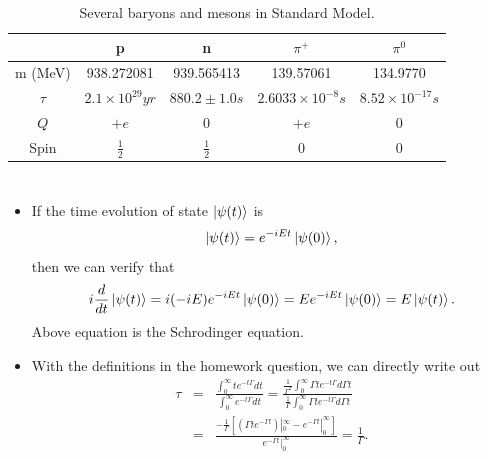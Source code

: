\documentclass[11pt]{article}
\begin{document}
\begin{table}[htb]
  \centering
  \caption{Several baryons and mesons in Standard Model. }
  \label{tb:bm}
  \begin{tabular}{|c|c|c|c|c|}
  \hline
            & p             & n              & $\pi^+$                  & $\pi^0$                \\ \hline
  m (MeV)   & 938.272081    & 939.565413     & 139.57061                & 134.9770               \\ \hline
  $\tau$ &$2.1 \times 10^{29} yr$        & $880.2 \pm1.0 s$ & $2.6033 \times 10 ^{-8} s$ & $8.52 \times 10^{-17} s$ \\ \hline
  $Q$       & $+e$          & 0              & $+e$                     & 0                      \\ \hline
  Spin      & $\frac{1}{2}$ & $\frac{1}{2}$  & 0                        & 0                      \\ \hline
  \end{tabular}
\end{table}
  
\section { }
\begin{itemize}
  \item If the time evolution of state $\ket{\psi(t)}$ is
  \begin{eqnarray}
    \ket{\psi(t)}=e^{-iEt}\ket{\psi(0)},
  \end{eqnarray} 
  then we can verify that
  \begin{eqnarray}
    i \frac{d}{dt} \ket{\psi(t)}=i(-i E) e^{-iEt}\ket{\psi(0)}  = E e^{-iEt}\ket{\psi(0)} = E \ket{\psi(t)}.
  \end{eqnarray}
  Above equation is the Schrodinger equation.
  \item With the definitions in the homework question, we can directly write out 
  \begin{eqnarray}
    \tau&=&\frac{\int_0^\infty t e^{-t\Gamma} dt}{\int_0^\infty  e^{-t\Gamma} dt}= \frac{\frac{1}{\Gamma^2}\int_0^\infty \Gamma t e^{-t\Gamma} d\Gamma t} {\frac{1}{\Gamma}\int_0^\infty \Gamma t e^{-t\Gamma} d\Gamma t} \nonumber \\
    &=&\frac{-\frac{1}{\Gamma}\left [(\Gamma t e^{-\Gamma t})|_0^\infty-e^{-\Gamma t}|_0^\infty  \right]}{e^{-\Gamma t}|_0^\infty}=\frac{1}{\Gamma}.
  \end{eqnarray}
\end{itemize}
\end{document}
